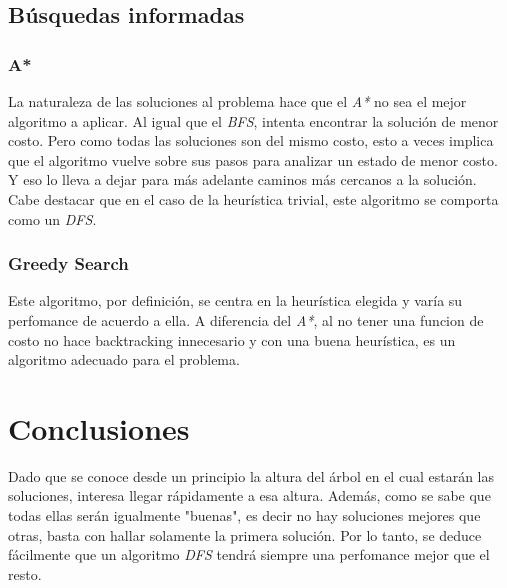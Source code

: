 \documentclass[a4paper,10pt]{article}
\begin{document}
 
\subsection{Búsquedas informadas}
    
    \subsubsection{A*}
    
    La naturaleza de las soluciones al problema hace que el \textit{A*} no sea el mejor algoritmo a aplicar. Al igual que el \textit{BFS}, intenta encontrar la solución de menor costo.
    Pero como todas las soluciones son del mismo costo, esto a veces implica que el algoritmo vuelve sobre sus pasos para analizar un estado de menor costo.
    Y eso lo lleva a dejar para más adelante caminos más cercanos a la solución. \\
    Cabe destacar que en el caso de la heurística trivial, este algoritmo se comporta como un \textit{DFS}.


    \subsubsection{Greedy Search}
    
    Este algoritmo, por definición, se centra en la heurística elegida y varía su perfomance de acuerdo a ella.
    A diferencia del \textit{A*}, al no tener una funcion de costo no hace backtracking innecesario y con una buena heurística, es un algoritmo adecuado para el problema.


\section{Conclusiones}
    Dado que se conoce desde un principio la altura del árbol en el cual estarán las soluciones, interesa llegar rápidamente a esa altura. Además, como se sabe que todas ellas serán 
    igualmente "buenas", es decir no hay soluciones mejores que otras, basta con hallar solamente la primera solución. Por lo tanto, se deduce fácilmente que un algoritmo 
    \textit{DFS} tendrá siempre una perfomance mejor que el resto. \\
\end{document}

